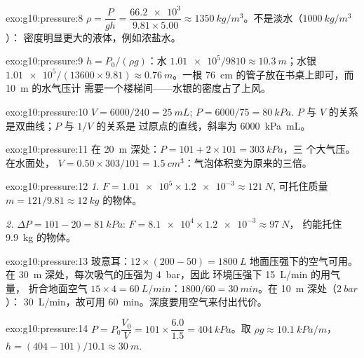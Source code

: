 \begin{solution}{exo:g10:pressure:8}
$\rho = \dfrac{P}{g h} = \dfrac{\num{66.2e3}}{9.81 \times 5.00}
\approx \qty{1350}{kg/m^3}$。不是淡水（$\qty{1000}{kg/m^3}$）：
密度明显更大的液体，例如浓盐水。
\end{solution}

\begin{solution}{exo:g10:pressure:9}
$h = P_0/(\rho g)$：水
$\num{1.01e5}/9810 \approx \qty{10.3}{m}$；水银
$\num{1.01e5}/(13600 \times 9.81) \approx \qty{0.76}{m}$。一根
\qty{76}{cm} 的管子放在书桌上即可，而 \qty{10}{m} 的水气压计
需要一个楼梯间——水银的密度占了上风。
\end{solution}

\begin{solution}{exo:g10:pressure:10}
$V = 6000/240 = \qty{25}{mL}$; $P = 6000/75 = \qty{80}{kPa}$.
$P$ 与 $V$ 的关系是双曲线；$P$ 与 $1/V$ 的关系是
过原点的直线，斜率为 \qty{6000}{kPa.mL}。
\end{solution}

\begin{solution}{exo:g10:pressure:11}
在 \qty{20}{m} 深处：$P = 101 + 2 \times 101 = \qty{303}{kPa}$，三
个大气压。在水面处，
$V = 0.50 \times 303/101 = \qty{1.5}{cm^3}$：气泡体积变为原来的三倍。
\end{solution}

\begin{solution}{exo:g10:pressure:12}
\emph{1.} $F = \num{1.01e5} \times \num{1.2e-3} \approx \qty{121}{N}$,
可托住质量 $m = 121/9.81 \approx \qty{12}{kg}$ 的物体。

\emph{2.} $\Delta P = 101 - 20 = \qty{81}{kPa}$:
$F = \num{8.1e4} \times \num{1.2e-3} \approx \qty{97}{N}$，
约能托住 \qty{9.9}{kg} 的物体。
\end{solution}

\begin{solution}{exo:g10:pressure:13}
玻意耳：$12 \times (200 - 50) = \qty{1800}{L}$ 地面压强下的空气可用。
在 \qty{30}{m} 深处，每次吸气的压强为 \qty{4}{bar}，因此
环境压强下 \qty{15}{L/min} 的用气量，
折合地面空气 $15 \times 4 = \qty{60}{L/min}$：$1800/60 =
\qty{30}{min}$。在 \qty{10}{m} 深处（$\qty{2}{bar}$）：
\qty{30}{L/min}，故可用 \qty{60}{min}。深度要用空气来付出代价。
\end{solution}

\begin{solution}{exo:g10:pressure:14}
$P = P_0 \dfrac{V_0}{V} = 101 \times \dfrac{6.0}{1.5} =
\qty{404}{kPa}$。取 $\rho g \approx \qty{10.1}{kPa/m}$，
$h = (404 - 101)/10.1 \approx \qty{30}{m}$.
\end{solution}

